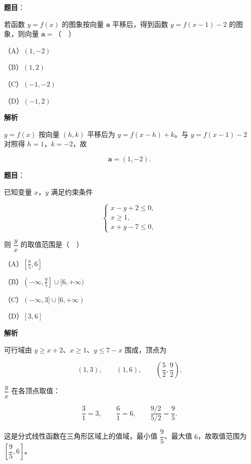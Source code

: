 \begin{answer}

\textbf{题目}：

若函数 $y=f(x)$ 的图象按向量 $\boldsymbol a$ 平移后，得到函数 $y=f(x-1)-2$ 的图象，则向量 $\boldsymbol a=$（　）

（A）$(1,-2)$

（B）$(1,2)$

（C）$(-1,-2)$

（D）$(-1,2)$

\textbf{解析}

$y=f(x)$ 按向量 $(h,k)$ 平移后为 $y=f(x-h)+k$。与 $y=f(x-1)-2$ 对照得 $h=1$，$k=-2$，故

\nopagebreak[4]
\[\boldsymbol a=(1,-2).\]


\end{answer}
\begin{answer}

\textbf{题目}：

已知变量 $x$，$y$ 满足约束条件

\nopagebreak[4]
\[\begin{cases}x-y+2\leqslant0,\\ x\geqslant1,\\ x+y-7\leqslant0,\end{cases}\]

则 $\dfrac yx$ 的取值范围是（　）

（A）$\left[\frac95,6\right]$

（B）$\left(-\infty,\frac95\right]\cup[6,+\infty)$

（C）$(-\infty,3]\cup[6,+\infty)$

（D）$[3,6]$

\textbf{解析}

可行域由 $y\geqslant x+2$、$x\geqslant1$、$y\leqslant7-x$ 围成，顶点为

\nopagebreak[4]
\[(1,3),\qquad (1,6),\qquad \left(\frac52,\frac92\right).\]

$\dfrac yx$ 在各顶点取值：

\nopagebreak[4]
\[\frac31=3,\qquad \frac61=6,\qquad \frac{9/2}{5/2}=\frac95.\]

这是分式线性函数在三角形区域上的值域，最小值 $\dfrac95$、最大值 $6$，故取值范围为 $\left[\dfrac95,6\right]$。


\end{answer}
